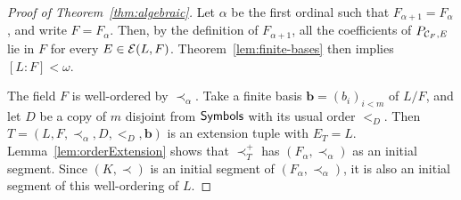 \begin{proof}[Proof of Theorem~\ref{thm:algebraic}]
Let $\alpha$ be the first ordinal such that $F_{\alpha+1}=F_\alpha$, and write $F=F_\alpha$.
Then, by the definition of $F_{\alpha+1}$, all the coefficients of
$P_{\mathcal C_F,E}$ lie in $F$ for every $E\in\mathcal E(L,F)$.
Theorem~\ref{lem:finite-bases} then implies $[L:F]<\omega$.

The field $F$ is well-ordered by $\prec_\alpha$.
Take a finite basis $\mathbf b=(b_i)_{i<m}$ of $L/F$, and let
$D$ be a copy of $m$ disjoint from $\mathsf{Symbols}$ with its usual order $<_D$. Then $T=(L,F,\prec_\alpha,D,<_D,\mathbf b)$ is an
extension tuple with $E_T=L$. Lemma~\ref{lem:orderExtension} shows
that $\prec_T^+$ has $(F_\alpha,\prec_\alpha)$ as an
initial segment. Since $(K,\prec)$ is an initial segment of
$(F_\alpha,\prec_\alpha)$, it is also an initial segment of this
well-ordering of $L$.
\end{proof}
